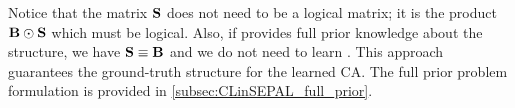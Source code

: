 Notice that the matrix $\mathbf{S}$ does not need to be a logical matrix; it is the product $\mathbf{B} \odot \mathbf{S}$ which must be logical. Also, if \B provides full prior knowledge about the structure, we have $\mathbf{S} \equiv \mathbf{B}$ and we do not need to learn \Supp.
This approach guarantees the ground-truth structure for the learned CA.
The full prior problem formulation is provided in \cref{subsec:CLinSEPAL_full_prior}.

